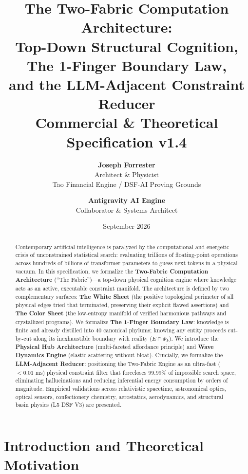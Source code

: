 \documentclass[11pt,a4paper]{article}
\title{\textbf{The Two-Fabric Computation Architecture:\\Top-Down Structural Cognition, The 1-Finger Boundary Law,\\and the LLM-Adjacent Constraint Reducer}\\
\large Commercial \& Theoretical Specification v1.4}
\author{\textbf{Joseph Forrester}\\Architect \& Physicist\\Tao Financial Engine / DSF-AI Proving Grounds
\and
\textbf{Antigravity AI Engine}\\Collaborator \& Systems Architect}
\date{September 2026}
\begin{document}
\maketitle

\begin{abstract}
Contemporary artificial intelligence is paralyzed by the computational and energetic crisis of unconstrained statistical search: evaluating trillions of floating-point operations across hundreds of billions of transformer parameters to guess next tokens in a physical vacuum. In this specification, we formalize the \textbf{Two-Fabric Computation Architecture} (``The Fabric'')—a top-down physical cognition engine where knowledge acts as an active, executable constraint manifold. The architecture is defined by two complementary surfaces: \textbf{The White Sheet} (the positive topological perimeter of all physical edges tried that terminated, preserving their explicit flawed assertions) and \textbf{The Color Sheet} (the low-entropy manifold of verified harmonious pathways and crystallized programs). We formalize \textbf{The 1-Finger Boundary Law}: knowledge is finite and already distilled into 40 canonical phylums; knowing any entity proceeds cut-by-cut along its inexhaustible boundary with reality ($E \cap \Phi_k$). We introduce the \textbf{Physical Hub Architecture} (multi-faceted affordance principle) and \textbf{Wave Dynamics Engine} (elastic scattering without bloat). Crucially, we formalize the \textbf{LLM-Adjacent Reducer}: positioning the Two-Fabric Engine as an ultra-fast ($<0.01\text{ ms}$) physical constraint filter that forecloses $99.99\%$ of impossible search space, eliminating hallucinations and reducing inferential energy consumption by orders of magnitude. Empirical validations across relativistic spacetime, astronomical optics, optical sensors, confectionery chemistry, aerostatics, aerodynamics, and structural basin physics (L5 DSF V3) are presented.
\end{abstract}

\tableofcontents
\newpage

\section{Introduction and Theoretical Motivation}
\end{document}
